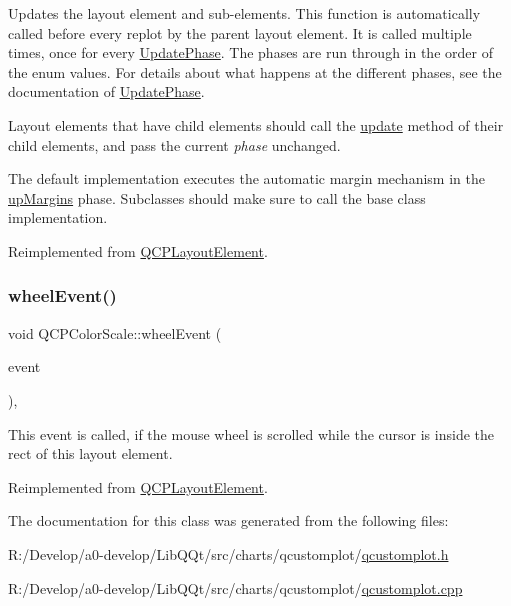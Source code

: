 Updates the layout element and sub-\/elements. This function is automatically called before every replot by the parent layout element. It is called multiple times, once for every \mbox{\hyperlink{class_q_c_p_layout_element_a0d83360e05735735aaf6d7983c56374d}{Update\+Phase}}. The phases are run through in the order of the enum values. For details about what happens at the different phases, see the documentation of \mbox{\hyperlink{class_q_c_p_layout_element_a0d83360e05735735aaf6d7983c56374d}{Update\+Phase}}.

Layout elements that have child elements should call the \mbox{\hyperlink{class_q_c_p_color_scale_ab8f6991ac88243fc582b44b183670334}{update}} method of their child elements, and pass the current {\itshape phase} unchanged.

The default implementation executes the automatic margin mechanism in the \mbox{\hyperlink{class_q_c_p_layout_element_a0d83360e05735735aaf6d7983c56374da288cb59a92280e47261a341f2813e676}{up\+Margins}} phase. Subclasses should make sure to call the base class implementation. 

Reimplemented from \mbox{\hyperlink{class_q_c_p_layout_element_a929c2ec62e0e0e1d8418eaa802e2af9b}{Q\+C\+P\+Layout\+Element}}.

\mbox{\label{class_q_c_p_color_scale_ab398e14c01240f3dc855884fe9e1ee8c}} 
\subsubsection{\texorpdfstring{wheel\+Event()}{wheelEvent()}}
{\footnotesize\ttfamily void Q\+C\+P\+Color\+Scale\+::wheel\+Event (\begin{DoxyParamCaption}\item[{Q\+Wheel\+Event $\ast$}]{event }\end{DoxyParamCaption})\hspace{0.3cm}{\ttfamily [protected]}, {\ttfamily [virtual]}}

This event is called, if the mouse wheel is scrolled while the cursor is inside the rect of this layout element. 

Reimplemented from \mbox{\hyperlink{class_q_c_p_layout_element_a300521d2fd18a893c1b85f6be11ce2bf}{Q\+C\+P\+Layout\+Element}}.



The documentation for this class was generated from the following files\+:\begin{DoxyCompactItemize}
\item 
R\+:/\+Develop/a0-\/develop/\+Lib\+Q\+Qt/src/charts/qcustomplot/\mbox{\hyperlink{qcustomplot_8h}{qcustomplot.\+h}}\item 
R\+:/\+Develop/a0-\/develop/\+Lib\+Q\+Qt/src/charts/qcustomplot/\mbox{\hyperlink{qcustomplot_8cpp}{qcustomplot.\+cpp}}\end{DoxyCompactItemize}
